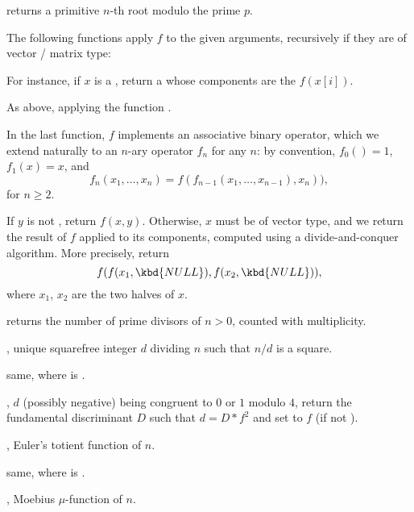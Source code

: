  returns a primitive $n$-th root
modulo the prime $p$.


The following functions apply $f$ to the given arguments, recursively
if they are of vector / matrix type:

 For instance, if $x$ is a
, return a  whose components are the $f(x[i])$.

 As above, applying the
function .



In the last function, $f$ implements an associative binary operator, which we
extend naturally to an $n$-ary operator $f_n$ for any $n$: by convention,
$f_0() = 1$, $f_1(x) = x$, and
$$ f_n(x_1,\dots,x_n) = f( f_{n-1}(x_1,\dots,x_{n-1}), x_n)),$$
for $n \geq 2$.

 If $y$ is not
, return $f(x,y)$. Otherwise, $x$ must be of vector type, and we
return the result of $f$ applied to its components, computed using a
divide-and-conquer algorithm. More precisely, return
$$f( f(x_1,\kbd{NULL}), f(x_2,\kbd{NULL}) ),$$
where $x_1$, $x_2$ are the two halves of $x$.


 returns the number of prime divisors of $n >
0$, counted with multiplicity.

, unique squarefree integer $d$ dividing $n$ such
that $n/d$ is a square.

 same, where  is .

, $d$ (possibly negative)
being congruent to $0$ or $1$ modulo $4$, return the fundamental
discriminant $D$ such that $d=D*f^2$ and set  to $f$
(if  not ).

, Euler's totient function of $n$.

 same, where  is .

, Moebius $\mu$-function of $n$.

